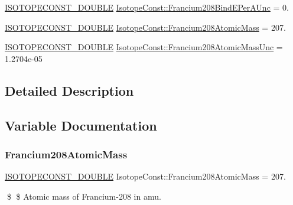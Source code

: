 \begin{DoxyCompactItemize}
\mbox{\hyperlink{group___isotope_const-_macros_ga8f45a7272ce02c0b4c65c44636ed719a}{I\+S\+O\+T\+O\+P\+E\+C\+O\+N\+S\+T\+\_\+\+D\+O\+U\+B\+LE}} \mbox{\hyperlink{group___isotope_const-_francium-_fr208_gaa68b3294325834bf2511fcaa9821fcc5}{Isotope\+Const\+::\+Francium208\+Bind\+E\+Per\+A\+Unc}} = 0.
\item 
\mbox{\hyperlink{group___isotope_const-_macros_ga8f45a7272ce02c0b4c65c44636ed719a}{I\+S\+O\+T\+O\+P\+E\+C\+O\+N\+S\+T\+\_\+\+D\+O\+U\+B\+LE}} \mbox{\hyperlink{group___isotope_const-_francium-_fr208_gab3972172ed6c9f724e21f46248161a01}{Isotope\+Const\+::\+Francium208\+Atomic\+Mass}} = 207.
\item 
\mbox{\hyperlink{group___isotope_const-_macros_ga8f45a7272ce02c0b4c65c44636ed719a}{I\+S\+O\+T\+O\+P\+E\+C\+O\+N\+S\+T\+\_\+\+D\+O\+U\+B\+LE}} \mbox{\hyperlink{group___isotope_const-_francium-_fr208_ga51e377efa707ecda118cb9419aee64ab}{Isotope\+Const\+::\+Francium208\+Atomic\+Mass\+Unc}} = 1.\+2704e-\/05
\end{DoxyCompactItemize}


\subsection{Detailed Description}


\subsection{Variable Documentation}
\mbox{\label{group___isotope_const-_francium-_fr208_gab3972172ed6c9f724e21f46248161a01}} 
\subsubsection{\texorpdfstring{Francium208\+Atomic\+Mass}{Francium208AtomicMass}}
{\footnotesize\ttfamily \mbox{\hyperlink{group___isotope_const-_macros_ga8f45a7272ce02c0b4c65c44636ed719a}{I\+S\+O\+T\+O\+P\+E\+C\+O\+N\+S\+T\+\_\+\+D\+O\+U\+B\+LE}} Isotope\+Const\+::\+Francium208\+Atomic\+Mass = 207.}

\$ \$ Atomic mass of Francium-\/208 in amu. \mbox{\label{group___isotope_const-_francium-_fr208_ga51e377efa707ecda118cb9419aee64ab}} 
